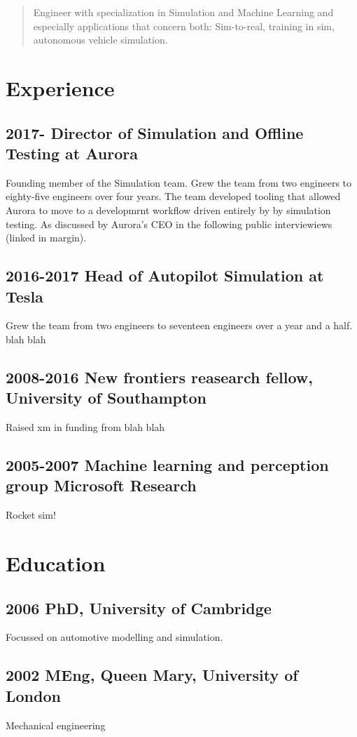 \maketitle
{}


\begin{abstract}
Engineer with specialization in Simulation and Machine Learning and especially applications that concern both: Sim-to-real, training in sim, autonomous vehicle simulation.
\end{abstract}

\section{Experience}

\subsection{2017- Director of Simulation and Offline Testing at Aurora}
Founding member of the Simulation team. Grew the team from two engineers to eighty-five engineers over four years. The team developed tooling that allowed Aurora to move to a developmrnt workflow driven entirely by by simulation testing. As discussed by Aurora's CEO in the following public interviewiews (linked in margin).

\subsection{2016-2017 Head of Autopilot Simulation at Tesla}
Grew the team from two engineers to seventeen engineers over a year and a half. blah blah

\subsection{2008-2016 New frontiers reasearch fellow, University of Southampton}
Raised xm in funding from blah blah

\subsection{2005-2007 Machine learning and perception group Microsoft Research}
Rocket sim!

\section{Education}
\subsection{2006 PhD, University of Cambridge}
Focussed on automotive modelling and simulation.
\subsection{2002 MEng, Queen Mary, University of London}
Mechanical engineering
